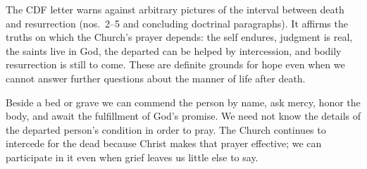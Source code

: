 The CDF letter warns against arbitrary pictures of the interval between death and resurrection (nos.~2--5 and concluding doctrinal paragraphs). It affirms the truths on which the Church's prayer depends: the self endures, judgment is real, the saints live in God, the departed can be helped by intercession, and bodily resurrection is still to come. These are definite grounds for hope even when we cannot answer further questions about the manner of life after death.

Beside a bed or grave we can commend the person by name, ask mercy, honor the body, and await the fulfillment of God's promise. We need not know the details of the departed person's condition in order to pray. The Church continues to intercede for the dead because Christ makes that prayer effective; we can participate in it even when grief leaves us little else to say.

